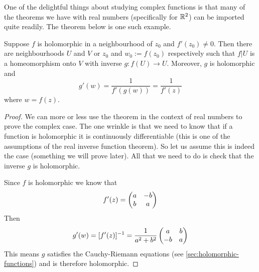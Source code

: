 One of the delightful things about studying complex functions is that many of the theorems we have with real numbers (specifically for $\mathbb{R}^2$) can be imported quite readily. The theorem below is one such example.
\begin{theorem}\label{thm:inv-func-thm}
Suppose $f$ is holomorphic in a neighbourhood of $z_0$ and $f'(z_0) \neq 0$. Then there are neighbourhoods $U$ and $V$ or $z_0$ and $w_0 := f(z_0)$ respectively such that $f|U$ is a homeomorphism onto $V$ with inverse $g: f(U) \to U$. Moreover, $g$ is holomorphic and
$$ g'(w) = \frac{1}{f'(g(w))} = \frac{1}{f'(z)} $$
where $w = f(z)$.
\end{theorem}
\begin{proof}
    We can more or less use the theorem in the context of real numbers to prove the complex case. The one wrinkle is that we need to know that if a function is holomorphic it is continuously differentiable (this is one of the assumptions of the real inverse function theorem). So let us assume this is indeed the case (something we will prove later). All that we need to do is check that the inverse $g$ is holomorphic.
    
    Since $f$ is holomorphic we know that
    $$ f'(z) = \begin{pmatrix} a &-b\\b & a \end{pmatrix} $$
    Then 
    $$ g'(w) = [f'(z)]^{-1} = \frac{1}{a^2 + b^2} \begin{pmatrix} a & b\\-b & a \end{pmatrix} $$
    This means $g$ satisfies the Cauchy-Riemann equations (see \autoref{sec:holomorphic-functions}) and is therefore holomorphic.
\end{proof}

